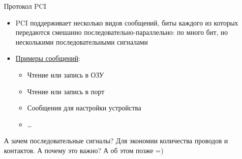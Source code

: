 \documentclass[xetex,aspectratio=43]{beamer}
\begin{document}
\begin{frame}{Протокол PCI}
    \begin{itemize}
        \item PCI поддерживает несколько видов сообщений, биты каждого из которых передаются смешанно последовательно-параллельно: по много бит, но несколькими последовательными сигналами
        \item \href{https://en.wikipedia.org/wiki/Peripheral_Component_Interconnect\#PCI_command_codes}{Примеры сообщений}:
        \begin{itemize}
            \item Чтение или запись в ОЗУ
            \item Чтение или запись в порт
            \item Сообщения для настройки устройства
            \item \ldots
        \end{itemize}
    \end{itemize}
    \pause
    \alert{А зачем последовательные сигналы? Для экономии количества проводов и контактов.} А почему это важно? А об этом позже =)
\end{frame}
\end{document}
